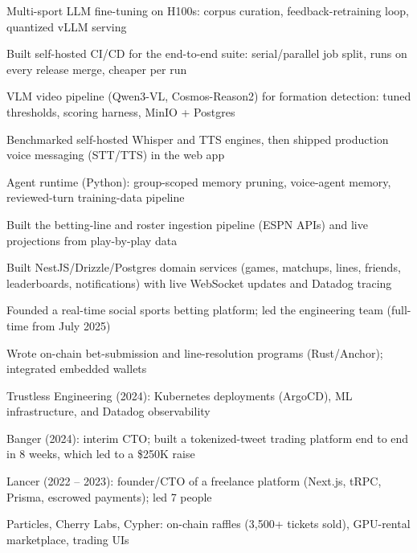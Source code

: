 \documentclass[print]{jack-resume}
\begin{document}
\begin{tightemize}
    \item Multi-sport LLM fine-tuning on H100s: corpus curation, feedback-retraining loop, quantized vLLM serving
    \item Built self-hosted CI/CD for the end-to-end suite: serial/parallel job split, runs on every release merge, cheaper per run
    \item VLM video pipeline (Qwen3-VL, Cosmos-Reason2) for formation detection: tuned thresholds, scoring harness, MinIO + Postgres
    \item Benchmarked self-hosted Whisper and TTS engines, then shipped production voice messaging (STT/TTS) in the web app
    \item Agent runtime (Python): group-scoped memory pruning, voice-agent memory, reviewed-turn training-data pipeline
\end{tightemize}
\sectionsep

\begin{tightemize}
    \item Built the betting-line and roster ingestion pipeline (ESPN APIs) and live projections from play-by-play data
    \item Built NestJS/Drizzle/Postgres domain services (games, matchups, lines, friends, leaderboards, notifications) with live WebSocket updates and Datadog tracing
    \item Founded a real-time social sports betting platform; led the engineering team (full-time from July 2025)
    \item Wrote on-chain bet-submission and line-resolution programs (Rust/Anchor); integrated embedded wallets
\end{tightemize}
\sectionsep

\begin{tightemize}
    \item Trustless Engineering (2024): Kubernetes deployments (ArgoCD), ML infrastructure, and Datadog observability
    \item Banger (2024): interim CTO; built a tokenized-tweet trading platform end to end in 8 weeks, which led to a \$250K raise
    \item Lancer (2022 -- 2023): founder/CTO of a freelance platform (Next.js, tRPC, Prisma, escrowed payments); led 7 people
    \item Particles, Cherry Labs, Cypher: on-chain raffles (3,500+ tickets sold), GPU-rental marketplace, trading UIs
\end{tightemize}
\sectionsep
\end{document}
